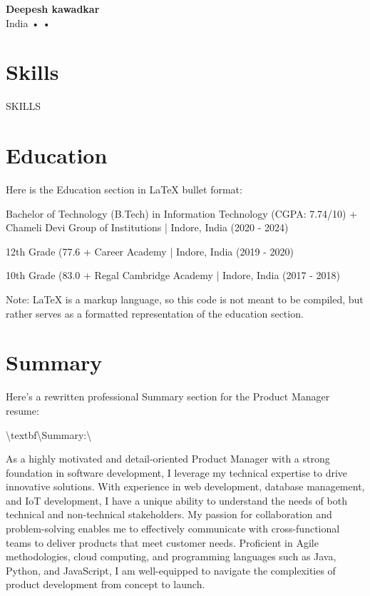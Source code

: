 \documentclass[11pt]{article}
\begin{document}
\noindent
\textbf{\LARGE Deepesh  kawadkar} \\
India •  • \href{mailto:}{{}} \\
\href{{}}{{}}

\section*{Skills}
{{SKILLS}}

\section*{Education}
Here is the Education section in LaTeX bullet format:

\begin{教育}
\item Bachelor of Technology (B.Tech) in Information Technology (CGPA: 7.74/10)
		+ Chameli Devi Group of Institutions | Indore, India (2020 - 2024)
\item 12th Grade (77.6%
		+ Career Academy | Indore, India (2019 - 2020)
\item 10th Grade (83.0%
		+ Regal Cambridge Academy | Indore, India (2017 - 2018)
\end{教育}

Note: LaTeX is a markup language, so this code is not meant to be compiled, but rather serves as a formatted representation of the education section.

\section*{Summary}
Here's a rewritten professional Summary section for the Product Manager resume:

\textbackslash{}textbf\textbackslash{}{Summary:\textbackslash{}}

As a highly motivated and detail-oriented Product Manager with a strong foundation in software development, I leverage my technical expertise to drive innovative solutions. With experience in web development, database management, and IoT development, I have a unique ability to understand the needs of both technical and non-technical stakeholders. My passion for collaboration and problem-solving enables me to effectively communicate with cross-functional teams to deliver products that meet customer needs. Proficient in Agile methodologies, cloud computing, and programming languages such as Java, Python, and JavaScript, I am well-equipped to navigate the complexities of product development from concept to launch.
\end{document}
